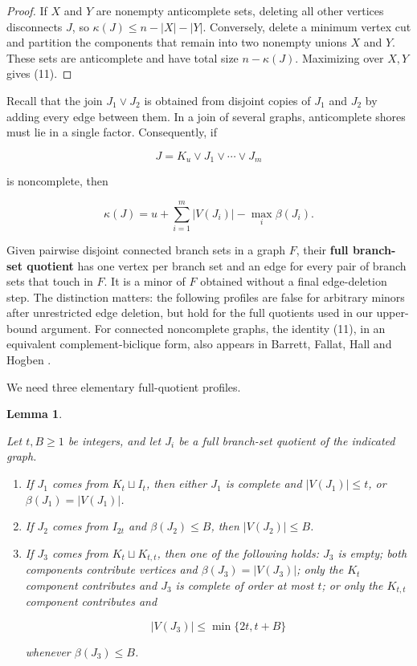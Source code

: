 \documentclass[11pt]{article}
\newtheorem{lemma}[theorem]{Lemma}
\begin{document}
\begin{proof}

If $X$ and $Y$ are nonempty anticomplete sets, deleting all other vertices
disconnects $J$, so $\kappa(J)\leq n-|X|-|Y|$. Conversely, delete a minimum
vertex cut and partition the components that remain into two nonempty unions
$X$ and $Y$. These sets are anticomplete and have total size
$n-\kappa(J)$. Maximizing over $X,Y$ gives (11).
\end{proof}


Recall that the join $J_1\vee J_2$ is obtained from disjoint copies of $J_1$
and $J_2$ by adding every edge between them. In a join of several graphs,
anticomplete shores must lie in a single factor. Consequently, if

\nopagebreak[4]
\[
J=K_u\vee J_1\vee\cdots\vee J_m
\]

is noncomplete, then

\nopagebreak[4]
\[
\kappa(J)=u+\sum_{i=1}^m |V(J_i)|-\max_i\beta(J_i).          \tag{12}
\]

Given pairwise disjoint connected branch sets in a graph $F$, their \textbf{full branch-set quotient} has one vertex per branch set and an edge for every pair
of branch sets that touch in $F$. It is a minor of $F$ obtained without a final
edge-deletion step. The distinction matters: the following profiles are false
for arbitrary minors after unrestricted edge deletion, but hold for the full
quotients used in our upper-bound argument. For connected noncomplete graphs,
the identity (11), in an equivalent complement-biclique form, also appears in
Barrett, Fallat, Hall and Hogben \cite{barrett2013}.

We need three elementary full-quotient profiles.

\begin{lemma}
\label{lem:profiles}

Let $t,B\geq1$ be integers, and let $J_i$ be a full branch-set quotient of the
indicated graph.

\begin{enumerate}
\item If $J_1$ comes from $K_t\sqcup I_t$, then either $J_1$ is complete and
   $|V(J_1)|\leq t$, or $\beta(J_1)=|V(J_1)|$.
\item If $J_2$ comes from $I_{2t}$ and $\beta(J_2)\leq B$, then
   $|V(J_2)|\leq B$.
\item If $J_3$ comes from $K_t\sqcup K_{t,t}$, then one of the following holds:
   $J_3$ is empty; both components contribute vertices and
   $\beta(J_3)=|V(J_3)|$; only the $K_t$ component contributes and $J_3$ is
   complete of order at most $t$; or only the $K_{t,t}$ component contributes
   and

\nopagebreak[4]
\[
   |V(J_3)|\leq\min\{2t,t+B\}                               \tag{13}
\]

   whenever $\beta(J_3)\leq B$.

\end{enumerate}

\end{lemma}
\end{document}
